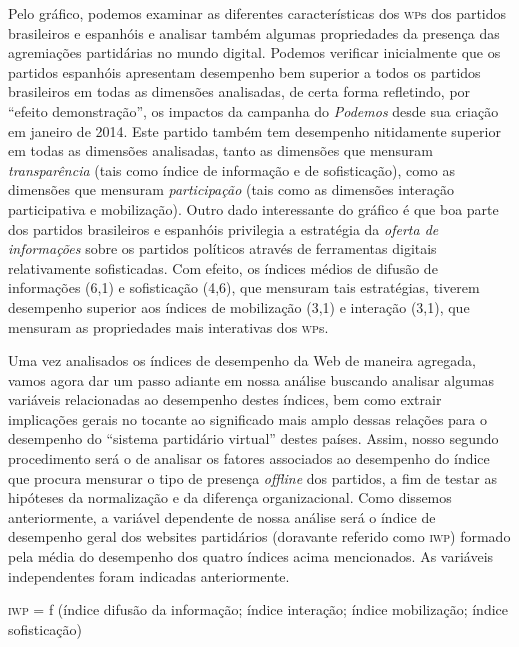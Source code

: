Pelo gráfico, podemos examinar as diferentes características dos \textsc{wp}s dos
partidos brasileiros e espanhóis e analisar também algumas propriedades
da presença das agremiações partidárias no mundo digital. Podemos
verificar inicialmente que os partidos espanhóis apresentam desempenho
bem superior a todos os partidos brasileiros em todas as dimensões
analisadas, de certa forma refletindo, por ``efeito demonstração'', os
impactos da campanha do \emph{Podemos} desde sua criação em janeiro de
2014. Este partido também tem desempenho nitidamente superior em todas
as dimensões analisadas, tanto as dimensões que mensuram
\emph{transparência} (tais como índice de informação e de sofisticação),
como as dimensões que mensuram \emph{participação} (tais como as
dimensões interação participativa e mobilização). Outro dado
interessante do gráfico é que boa parte dos partidos brasileiros e
espanhóis privilegia a estratégia da \emph{oferta de informações} sobre
os partidos políticos através de ferramentas digitais relativamente
sofisticadas. Com efeito, os índices médios de difusão de informações
(6,1) e sofisticação (4,6), que mensuram tais estratégias, tiverem
desempenho superior aos índices de mobilização (3,1) e interação (3,1),
que mensuram as propriedades mais interativas dos \textsc{wp}s.

Uma vez analisados os índices de desempenho da Web de maneira agregada,
vamos agora dar um passo adiante em nossa análise buscando analisar
algumas variáveis relacionadas ao desempenho destes índices, bem como
extrair implicações gerais no tocante ao significado mais amplo dessas
relações para o desempenho do ``sistema partidário virtual'' destes
países. Assim, nosso segundo procedimento será o de analisar os fatores
associados ao desempenho do índice que procura mensurar o tipo de
presença \emph{offline} dos partidos, a fim de testar as hipóteses da
normalização e da diferença organizacional. Como dissemos anteriormente,
a variável dependente de nossa análise será o índice de desempenho geral
dos websites partidários (doravante referido como \textsc{iwp}) formado pela
média do desempenho dos quatro índices acima mencionados. As variáveis
independentes foram indicadas anteriormente.

\asterisc
\textsc{iwp} = f (índice difusão da informação; índice interação; índice
mobilização; índice sofisticação)
\asterisc

